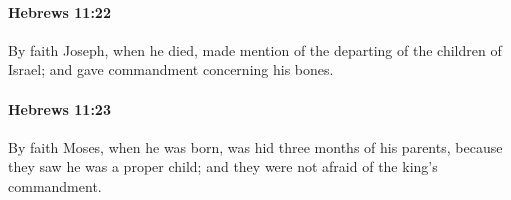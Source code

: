 		\paragraph{Hebrews 11:22} %
			\label{HEBREWS-11-22}

			By faith Joseph, when he died, made mention of the departing of the children of Israel; and gave commandment concerning his bones.

			\begin{framed}
			\scriptsize
				\begin{compactdesc}
					\item[SBLG] 
				\end{compactdesc}
			\end{framed}

		\paragraph{Hebrews 11:23} %
			\label{HEBREWS-11-23}

			By faith Moses, when he was born, was hid three months of his parents, because they saw he was a proper child; and they were not afraid of the king's commandment.

